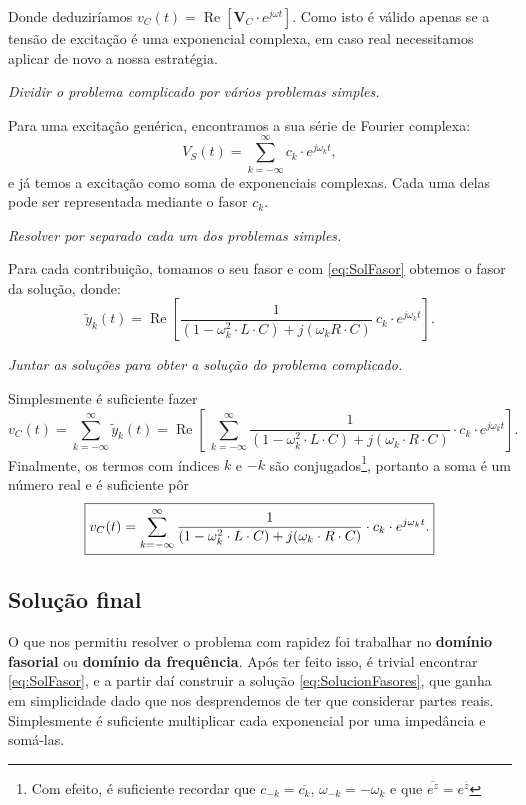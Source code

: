 Donde deduziríamos $v_C(t) = \operatorname{Re} \left[\mathbf{V}_C \cdot e^{j\omega t}\right]$. Como isto é válido apenas se a tensão de excitação é uma exponencial complexa, em caso real necessitamos aplicar de novo a nossa estratégia.

\begin{enumerate}[{\bfseries [1]}]
  \item\textit{\color{blue} Dividir o problema complicado por vários problemas simples.}

    Para uma excitação genérica, encontramos a sua série de Fourier complexa:
    \[
    V_S(t) = \sum_{k=-\infty}^\infty c_k \cdot e^{j\omega_k t},
    \]
    e já temos a excitação como soma de exponenciais complexas. Cada uma delas pode ser representada mediante o fasor $c_k$.
  \item \textit{\color{blue}Resolver por separado cada um dos problemas simples.}

    Para cada contribuição, tomamos o seu fasor e com \eqref{eq:SolFasor} obtemos o fasor da solução, donde:
    \[\boxed{
      \tilde{y}_k (t)= \operatorname{Re}\left[\frac{1}{(1-\omega_k^2 \cdot  L\cdot C) + j(\omega_k R\cdot C)}\ c_k\cdot  e^{j\omega_k t}\right].
    }\]
  \item \textit{\color{blue}Juntar as soluções para obter a solução do problema complicado.}

    Simplesmente é suficiente fazer
    \[
    v_C(t) =  \sum_{k=-\infty}^\infty \tilde{y}_k(t) = \operatorname{Re}\left[\ \sum_{k=-\infty}^\infty \frac{1}{(1-\omega_k^2 \cdot L\cdot C) + j(\omega_k\cdot R\cdot C)}\cdot  c_k\cdot e^{j\omega_k t}  \right].
    \] 
    Finalmente, os termos com índices $k$ e $-k$ são conjugados\footnote{Com efeito, é suficiente recordar que $c_{-k} = \overline{c_k}$, $\omega_{-k}=-\omega_k$ e que $\overline{e^z}=e^{\overline{z}}$}, portanto a soma é um número real e é suficiente pôr
    \begin{equation} \boxed{
      \label{eq:SolucionFasores}
      v_C(t) = \sum_{k=-\infty}^\infty \frac{1}{(1-\omega_k^2 \cdot L\cdot C) + j(\omega_k\cdot R\cdot C)}\cdot c_k \cdot e^{j\omega_k t}.
    } \end{equation}
\end{enumerate}




\subsection{Solução final}
O que nos permitiu resolver o problema com rapidez foi trabalhar no \textbf{domínio fasorial} ou \textbf{domínio da frequência}. Após ter feito isso, é trivial encontrar \eqref{eq:SolFasor}, e a partir daí construir a solução \eqref{eq:SolucionFasores}, que ganha em simplicidade dado que nos desprendemos de ter que considerar partes reais. Simplesmente é suficiente multiplicar cada exponencial por uma impedância e somá-las.

